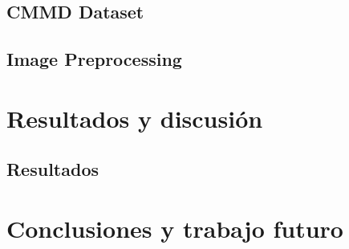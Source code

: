 \documentclass[a4paper,10pt]{book}
\begin{document}
\section{CMMD Dataset}
\section{Image Preprocessing}

\chapter{Resultados y discusión}
\section{Resultados}

\chapter{Conclusiones y trabajo futuro}

\backmatter
{}


\end{document}
